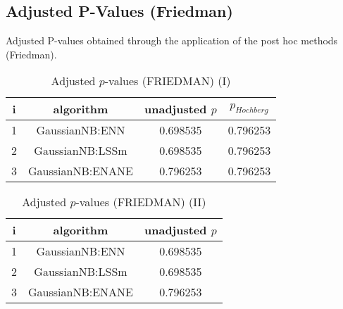 \documentclass[a4paper,10pt]{article}
\begin{document}
\begin{landscape}
\section{Adjusted P-Values (Friedman)}


Adjusted P-values obtained through the application of the post hoc methods (Friedman).

\begin{table}[!htp]
\centering\small
\begin{tabular}{cccc}
i&algorithm&unadjusted $p$&$p_{Hochberg}$\\
\hline1&GaussianNB:ENN&0.698535&0.796253\\2&GaussianNB:LSSm&0.698535&0.796253\\3&GaussianNB:ENANE&0.796253&0.796253\\\hline
\end{tabular}
\caption{Adjusted $p$-values (FRIEDMAN) (I)}
\end{table}
\begin{table}[!htp]
\centering\small
\begin{tabular}{ccc}
i&algorithm&unadjusted $p$\\
\hline1&GaussianNB:ENN&0.698535\\2&GaussianNB:LSSm&0.698535\\3&GaussianNB:ENANE&0.796253\\\hline
\end{tabular}
\caption{Adjusted $p$-values (FRIEDMAN) (II)}
\end{table}

\newpage
\end{landscape}
\end{document}
